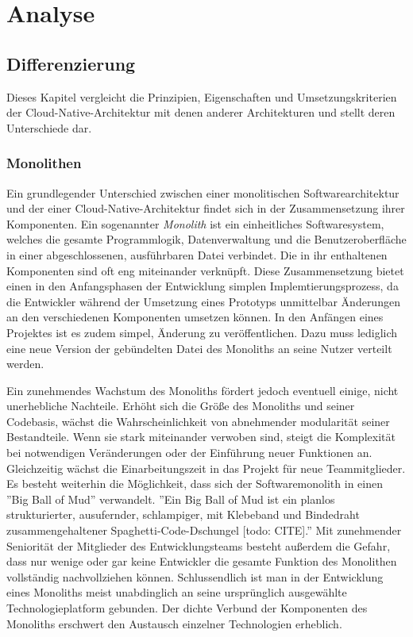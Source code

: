 \chapter{Analyse}
\label{ch:analyse}

\section{Differenzierung}

Dieses Kapitel vergleicht die Prinzipien, Eigenschaften und Umsetzungskriterien der Cloud-Native-Architektur mit denen anderer Architekturen und stellt deren Unterschiede dar.

\subsection{Monolithen}

Ein grundlegender Unterschied zwischen einer monolitischen Softwarearchitektur und der einer Cloud-Native-Architektur findet sich in der Zusammensetzung ihrer Komponenten. Ein sogenannter \textit{Monolith} ist ein einheitliches Softwaresystem, welches die gesamte Programmlogik, Datenverwaltung und die Benutzeroberfläche in einer abgeschlossenen, ausführbaren Datei verbindet. Die in ihr enthaltenen Komponenten sind oft eng miteinander verknüpft. Diese Zusammensetzung bietet einen in den Anfangsphasen der Entwicklung simplen Implemtierungsprozess, da die Entwickler während der Umsetzung eines Prototyps unmittelbar Änderungen an den verschiedenen Komponenten umsetzen können. In den Anfängen eines Projektes ist es zudem simpel, Änderung zu veröffentlichen. Dazu muss lediglich eine neue Version der gebündelten Datei des Monoliths an seine Nutzer verteilt werden.

Ein zunehmendes Wachstum des Monoliths fördert jedoch eventuell einige, nicht unerhebliche Nachteile. Erhöht sich die Größe des Monoliths und seiner Codebasis, wächst die Wahrscheinlichkeit von abnehmender modularität seiner Bestandteile. Wenn sie stark miteinander verwoben sind, steigt die Komplexität bei notwendigen Veränderungen oder der Einführung neuer Funktionen an. Gleichzeitig wächst die Einarbeitungszeit in das Projekt für neue Teammitglieder. Es besteht weiterhin die Möglichkeit, dass sich der Softwaremonolith in einen ''Big Ball of Mud'' verwandelt. ''Ein Big Ball of Mud ist ein planlos strukturierter, ausufernder, schlampiger, mit Klebeband und Bindedraht zusammengehaltener Spaghetti-Code-Dschungel [todo: CITE].'' Mit zunehmender Seniorität der Mitglieder des Entwicklungsteams besteht außerdem die Gefahr, dass nur wenige oder gar keine Entwickler die gesamte Funktion des Monolithen vollständig nachvollziehen können. Schlussendlich ist man in der Entwicklung eines Monoliths meist unabdinglich an seine ursprünglich ausgewählte Technologieplatform gebunden. Der dichte Verbund der Komponenten des Monoliths erschwert den Austausch einzelner Technologien erheblich. \\

